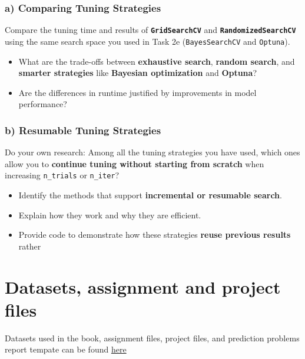 \documentclass[
  letterpaper,
  DIV=11,
  numbers=noendperiod]{scrreprt}
\providecommand{\tightlist}{%
  \setlength{\itemsep}{0pt}\setlength{\parskip}{0pt}}\usepackage{longtable,booktabs,array}
\begin{document}
\subsection{a) Comparing Tuning
Strategies}\label{a-comparing-tuning-strategies}

Compare the tuning time and results of \textbf{\texttt{GridSearchCV}}
and \textbf{\texttt{RandomizedSearchCV}} using the same search space you
used in Task 2e (\texttt{BayesSearchCV} and \texttt{Optuna}).

\begin{itemize}
\tightlist
\item
  What are the trade-offs between \textbf{exhaustive search},
  \textbf{random search}, and \textbf{smarter strategies} like
  \textbf{Bayesian optimization} and \textbf{Optuna}?
\item
  Are the differences in runtime justified by improvements in model
  performance?
\end{itemize}

\subsection{b) Resumable Tuning
Strategies}\label{b-resumable-tuning-strategies}

Do your own research: Among all the tuning strategies you have used,
which ones allow you to \textbf{continue tuning without starting from
scratch} when increasing \texttt{n\_trials} or \texttt{n\_iter}?

\begin{itemize}
\tightlist
\item
  Identify the methods that support \textbf{incremental or resumable
  search}.
\item
  Explain how they work and why they are efficient.
\item
  Provide code to demonstrate how these strategies \textbf{reuse
  previous results} rather
\end{itemize}

\chapter{Datasets, assignment and project
files}\label{datasets-assignment-and-project-files}

Datasets used in the book, assignment files, project files, and
prediction problems report tempate can be found
\href{https://nuwildcat-my.sharepoint.com/:f:/g/personal/lsi8012_ads_northwestern_edu/EoFpYaluaQhCtdC_nsWbcWUBcEZIw54odn3ssRMRQ1B8DA?e=Bb4YaM}{here}
\end{document}
